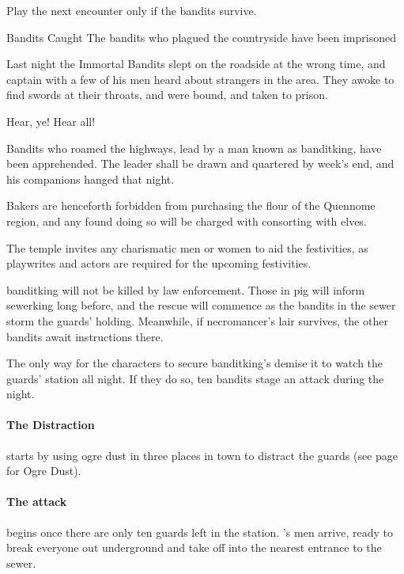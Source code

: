 \begin{multicols}{2}

\banditking

Play the next encounter only if the bandits survive.

\resumecontents[Town]

{Bandits Caught}%
{The bandits who plagued the countryside have been imprisoned}%

\stopcontents[Town]

Last night the Immortal Bandits slept on the roadside at the wrong time, and \gls{captain} with a few of his men heard about strangers in the area.
They awoke to find swords at their throats, and were bound, and taken to prison.

\begin{boxtext}

	Hear, ye!  Hear all!

	Bandits who roamed the highways, lead by a man known as \gls{banditking}, have been apprehended.  The leader shall be drawn and quartered by week's end, and his companions hanged that night.

	Bakers are henceforth forbidden from purchasing the flour of the Quennome region, and any found doing so will be charged with consorting with elves.

	The temple invites any charismatic men or women to aid the festivities, as playwrites and actors are required for the upcoming festivities.

\end{boxtext}

\Gls{banditking} will not be killed by law enforcement.
Those in \gls{pig} will inform \gls{sewerking} long before, and the rescue will commence as the bandits in the sewer storm the guards' holding.
Meanwhile, if \gls{necromancer}'s lair survives, the other bandits await instructions there.

The only way for the characters to secure \gls{banditking}'s demise it to watch the guards' station all night.
If they do so, ten bandits stage an attack during the night.

\paragraph{The Distraction} starts by using ogre dust in three places in town to distract the guards (see page \pageref{ogredust} for Ogre Dust).

\paragraph{The attack}
begins once there are only ten guards left in the station.
's men arrive, ready to break everyone out underground and take off into the nearest entrance to the sewer.


\stopcontents[sq]

\stopcontents[Villages]

\end{multicols}

